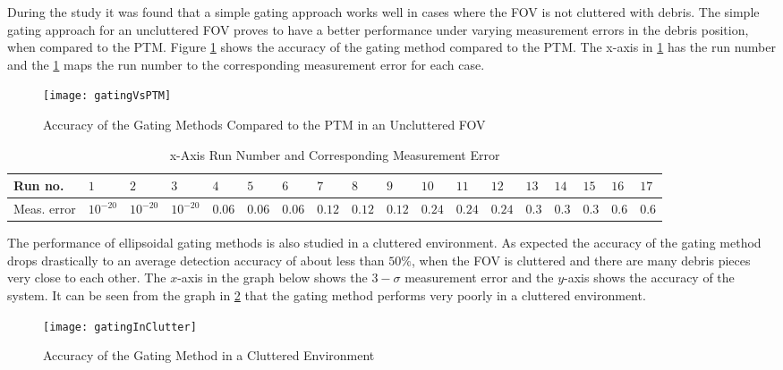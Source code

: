 \documentclass[]{aiaa-tc}%
\begin{document}
During the study it was found that a simple gating approach works well in cases where the FOV is not cluttered with debris. The simple gating approach for an uncluttered FOV proves to have a better performance under varying measurement errors in the debris position, when compared to the PTM. Figure \ref{GatingVsPTM} shows the accuracy of the gating method compared to the PTM. The x-axis in \cref{GatingVsPTM} has the run number and the \cref{map} maps the run number to the corresponding measurement error for each case.\\
\begin{figure}[h]
\centering
\texttt{[image: gatingVsPTM]}
\caption{Accuracy of the Gating Methods Compared to the PTM in an Uncluttered FOV}
\label{GatingVsPTM}
\end{figure}

\begin{table}
\begin{tabular}[0.4\textwidth]{|p{0.9cm}|p{0.7cm}|p{0.7cm}|p{0.7cm}|p{0.45cm}|p{0.45cm}|p{0.45cm}|p{0.45cm}|p{0.45cm}|p{0.45cm}|p{0.45cm}|p{0.45cm}|p{0.45cm}|p{0.45cm}|p{0.45cm}|p{0.45cm}|p{0.45cm}|p{0.45cm}|}
\hline
Run no. & $1$ & $2$ & $3$ & $4$ & $5$ & $6$ & $7$ & $8$ & $9$ & $10$ & $11$ & $12$ & $13$ & $14$ & $15$ & $16$ & $17$\\
\hline
Meas. error & $10^{-20}$ & $10^{-20}$ & $10^{-20}$ & $0.06$ & $0.06$ & $0.06$ & $0.12$& $0.12$& $0.12$ & $0.24$& $0.24$& $0.24$ & $0.3$ &  $0.3$ & $0.3$ &$0.6$& $0.6$\\
\hline 
\end{tabular}
\caption{x-Axis Run Number and Corresponding Measurement Error}\label{map}
\end{table}

The performance of ellipsoidal gating methods is also studied in a cluttered environment. As expected the accuracy of the gating method drops drastically to an average detection accuracy of about less than $50\%$,  when the FOV is cluttered and there are many debris pieces very close to each other. The $x$-axis in the graph below shows the $3-\sigma$ measurement error and the $y$-axis shows the accuracy of the system. It can be seen from the graph in \cref{gatingInClutter} that the gating method performs very poorly in a cluttered environment.\\

\begin{figure}[h]
\centering
\texttt{[image: gatingInClutter]}
\caption{Accuracy of the Gating Method in a Cluttered Environment}
\label{gatingInClutter}
\end{figure}
\end{document}
